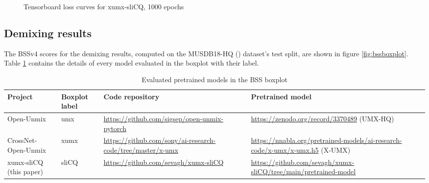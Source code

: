 \documentclass[report.tex]{subfiles}
\begin{document}
\begin{figure}[ht]
	\centering
	\hspace{0.5em}
	\caption{Tensorboard loss curves for xumx-sliCQ, 1000 epochs}
	\label{fig:networkloss}
\end{figure}

\subsection{Demixing results}

The BSSv4 scores for the demixing results, computed on the MUSDB18-HQ (\cite{musdb18hq}) dataset's test split, are shown in figure \ref{fig:bssboxplot}. Table \ref{table:bsseval} contains the details of every model evaluated in the boxplot with their label.

\begin{table}[ht]
	\centering
	\begin{tabular}{ |l|l|p{4cm}|p{4cm}| }
	 \hline
	  Project & Boxplot label & Code repository & Pretrained model \\
	 \hline
	 \hline
		\makecell[l]{Open-Unmix \\ \textcite{umx}} & umx & \url{https://github.com/sigsep/open-unmix-pytorch} & \url{https://zenodo.org/record/3370489} (UMX-HQ) \\
	 \hline
		\makecell[l]{CrossNet-Open-Unmix \\ \textcite{xumx}} & xumx & \url{https://github.com/sony/ai-research-code/tree/master/x-umx} & \url{https://nnabla.org/pretrained-models/ai-research-code/x-umx/x-umx.h5} (X-UMX) \\
	 \hline
		\makecell[l]{xumx-sliCQ \\ (this paper)} & sliCQ & \url{https://github.com/sevagh/xumx-sliCQ} & \url{https://github.com/sevagh/xumx-sliCQ/tree/main/pretrained-model} \\
	 \hline
\end{tabular}
	\caption{Evaluated pretrained models in the BSS boxplot}
	\label{table:bsseval}
\end{table}
\end{document}
